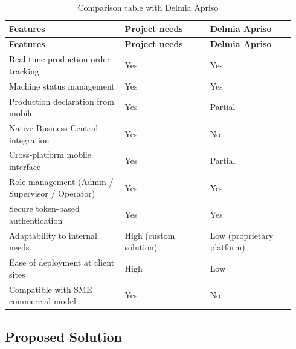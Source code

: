 \begin{longtable}{@{}P{0.38\linewidth}P{0.28\linewidth}P{0.28\linewidth}@{}}
	\caption{Comparison table with Delmia Apriso}
	\label{tab:mescha-comparaison_existant} \\
	\toprule
	\textbf{Features}                               & \textbf{Project needs} & \textbf{Delmia Apriso}     \\
	\midrule
	\endfirsthead
	
	\toprule
	\textbf{Features}                               & \textbf{Project needs} & \textbf{Delmia Apriso}     \\
	\midrule
	\endhead
	
	  
	
	
	\endlastfoot
	
	Real-time production order tracking             & Yes                    & Yes                        \\ \midrule
	Machine status management                       & Yes                    & Yes                        \\ \midrule
	Production declaration from mobile              & Yes                    & Partial                    \\ \midrule
	Native Business Central integration             & Yes                    & No                         \\ \midrule
	Cross-platform mobile interface                 & Yes                    & Partial                    \\ \midrule
	Role management (Admin / Supervisor / Operator) & Yes                    & Yes                        \\ \midrule
	Secure token-based authentication               & Yes                    & Yes                        \\ \midrule
	Adaptability to internal needs                  & High (custom solution) & Low (proprietary platform) \\ \midrule
	Ease of deployment at client sites              & High                   & Low                        \\ \midrule
	Compatible with SME commercial model            & Yes                    & No                         \\ \bottomrule
\end{longtable}

\subsection{Proposed Solution}

